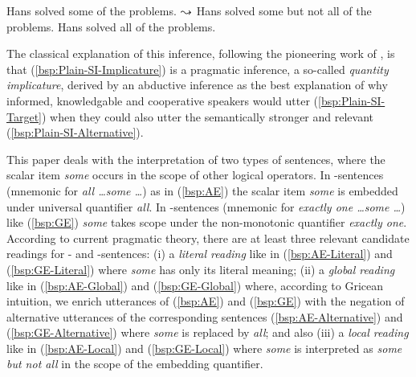 \documentclass[fleqn,reqno,10pt,draft]{article}
\newcommand{\as}{\acro{as}}
\renewcommand{\es}{\acro{es}}
\begin{document}
\begin{exe}
  \ex \label{bsp:Plain-SI}
    \begin{xlist}
      \ex \label{bsp:Plain-SI-Target} Hans solved some of the
        problems.
      \ex \label{bsp:Plain-SI-Implicature} $\leadsto$ Hans solved
        some but not all of the problems.
      \ex \label{bsp:Plain-SI-Alternative} Hans solved all of the problems.
    \end{xlist}
\end{exe}

\noindent The classical explanation of this inference, following the
pioneering work of \citet{Grice1975:Logic-and-Conve} \citep[see][for
recent overview]{Geurts2010:Quantity-Implic}, is that
(\ref{bsp:Plain-SI-Implicature}) is a pragmatic inference, a so-called
\emph{quantity implicature}, derived by an abductive inference as the
best explanation of why informed, knowledgable and cooperative
speakers would utter (\ref{bsp:Plain-SI-Target}) when they could also
utter the semantically stronger and relevant
(\ref{bsp:Plain-SI-Alternative}).




This paper deals with the interpretation of two types of sentences,
where the scalar item \emph{some} occurs in the scope of other logical
operators. In \as-sentences (mnemonic for \textit{all \dots some \dots})
as in (\ref{bsp:AE}) the scalar item \emph{some} is embedded under
universal quantifier \emph{all}. In \es-sentences (mnemonic for
\textit{exactly one \dots some \dots}) like (\ref{bsp:GE}) \emph{some}
takes scope under the non-monotonic quantifier \emph{exactly one}.
According to current pragmatic theory, there are at least three
relevant candidate readings for \as- and \es-sentences: (i) a
\emph{literal reading} like in (\ref{bsp:AE-Literal}) and
(\ref{bsp:GE-Literal}) where \emph{some} has only its literal meaning;
(ii) a \emph{global reading} like in (\ref{bsp:AE-Global}) and
(\ref{bsp:GE-Global}) where, according to Gricean intuition, we enrich
utterances of (\ref{bsp:AE}) and (\ref{bsp:GE}) with the negation of
alternative utterances of the corresponding sentences
(\ref{bsp:AE-Alternative}) and (\ref{bsp:GE-Alternative}) where
\emph{some} is replaced by \emph{all}; and also (iii) a \emph{local
  reading} like in (\ref{bsp:AE-Local}) and (\ref{bsp:GE-Local}) where
\emph{some} is interpreted as \emph{some but not all} in the scope of
the embedding quantifier.
\end{document}
